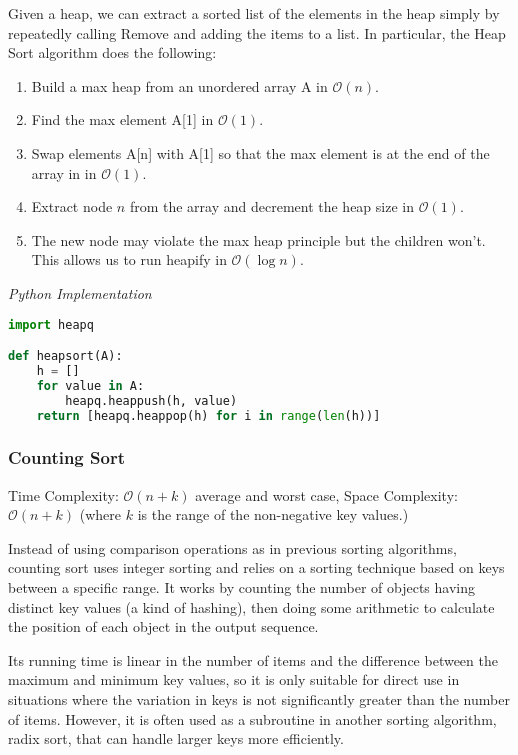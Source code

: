 \documentclass{article}
\newcommand{\bigO}{\mathcal{O}}
\begin{document}
    Given a heap, we can extract a sorted list of the elements in the heap simply by repeatedly calling Remove and adding the items to a list. In particular, the Heap Sort algorithm does the following: 
    \begin{enumerate}
        \item Build a max heap from an unordered array A in $\bigO(n)$.
        \item Find the max element A[1] in $\bigO(1)$.
        \item Swap elements A[n] with A[1] so that the max element is at the end of the array in in $\bigO(1)$.
        \item Extract node $n$ from the array and decrement the heap size in $\bigO(1)$.
        \item The new node may violate the max heap principle but the children won't. This allows us to run heapify in $\bigO(\log n)$.
    \end{enumerate}
    
\vspace{8pt} \emph{Python Implementation}
\begin{lstlisting}[language=Python]
import heapq

def heapsort(A):
    h = []
    for value in A:
        heapq.heappush(h, value)
    return [heapq.heappop(h) for i in range(len(h))]
\end{lstlisting}

    \subsubsection{Counting Sort}
    Time Complexity: $\bigO(n + k)$ average and worst case, Space Complexity: $\bigO(n + k)$ (where $k$ is the range of the non-negative key values.)
    
    Instead of using comparison operations as in previous sorting algorithms, counting sort uses integer sorting and relies on a sorting technique based on keys between a specific range. It works by counting the number of objects having distinct key values (a kind of hashing), then doing some arithmetic to calculate the position of each object in the output sequence.
    
    Its running time is linear in the number of items and the difference between the maximum and minimum key values, so it is only suitable for direct use in situations where the variation in keys is not significantly greater than the number of items. However, it is often used as a subroutine in another sorting algorithm, radix sort, that can handle larger keys more efficiently.
\end{document}
